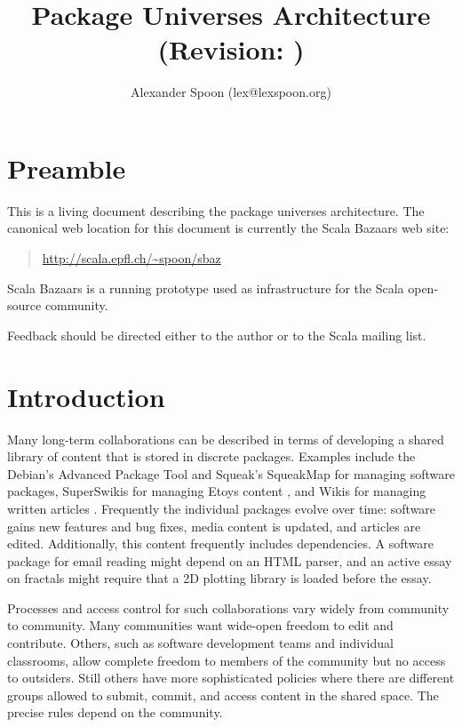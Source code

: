 \documentclass{article}
\begin{document}

\title{Package Universes Architecture\\
       (Revision: )}
\author{Alexander Spoon (lex@lexspoon.org)}
\date{}
\maketitle

\section{Preamble}
This is a living document describing the package universes
architecture.  
The canonical web location for this document is currently the Scala
Bazaars web site:
\begin{quote}
  \url{http://scala.epfl.ch/~spoon/sbaz}
\end{quote}
Scala Bazaars is a running prototype used as infrastructure for the
Scala \cite{scala:spec, scala:web} open-source community.

Feedback should be directed either to the author or to the Scala
mailing list.


\section{Introduction}
Many long-term collaborations can be described in terms of developing
a shared library of content that is stored in discrete packages.  
Examples include the Debian's Advanced Package Tool \cite{apt:howto} and
Squeak's SqueakMap for managing software packages, SuperSwikis for
managing Etoys content \cite{steinmetz02:learning}, and Wikis for
managing written articles \cite{ward01:wikiway}.  Frequently the
individual packages evolve over time: software gains new features and
bug fixes, media content is updated, and articles are edited.
Additionally, this content frequently includes dependencies.  A
software package for email reading might depend on an HTML
parser, and an active essay on fractals might require that
a 2D plotting library is loaded before the essay.

Processes and access control for such collaborations vary widely from
community to community.  Many communities want wide-open freedom to edit
and contribute.  Others, such as software development teams and
individual classrooms, allow complete freedom to members of the
community but no access to outsiders.  Still others have more
sophisticated policies where there are different groups allowed to
submit, commit, and access content in the shared space.  The precise
rules depend on the community.
\end{document}
